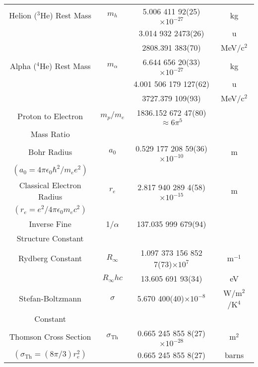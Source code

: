 \begin{table}[h]
\begin{tabular}{c c c c}
    Helion ($^3$He) Rest Mass  & $m_h$        & 5.006 411 92(25)$\times10^{-27}$   & kg \\
                               &              & 3.014 932 2473(26)                 & u \\
                               &              & 2808.391 383(70)                   & MeV/c$^2$ \\[6pt]
    
    Alpha ($^4$He) Rest Mass & $m_\alpha$    & 6.644 656 20(33)$\times10^{-27}$   & kg \\
                             &               & 4.001 506 179 127(62)              & u \\
                             &               & 3727.379 109(93)                   & MeV/c$^2$ \\[6pt]

    Proton to Electron & $m_{p}/m_{e}$ & 1836.152 672 47(80) $\approx 6 \pi^{5}$ &  \\
    Mass Ratio & & &\\[6pt]
    
    Bohr Radius                            & $a_0$   & 0.529 177 208 59(36)$\times10^{-10}$ & m \\
    $(a_0 = 4\pi\epsilon_0\hbar^2/m_ee^2)$ &         &                                      & \\[6pt]

    Classical Electron Radius           & $r_e$        & 2.817 940 289 4(58)$\times10^{-15}$ & m \\
    $(r_e = e^2/4\pi\epsilon_0m_ec^2)$  &              &                                     & \\[6pt]
    
    Inverse Fine & 1/$\alpha$ & 137.035 999 679(94)         & \\
    Structure Constant & & &\\[6pt]
    
    Rydberg Constant          & $R_\infty$     & 1.097 373 156 852 7(73)$\times10^7$ & m$^{-1}$ \\
                              & $R_\infty hc$  & 13.605 691 93(34)                       & eV \\[6pt]
    
    Stefan-Boltzmann & $\sigma$      & 5.670 400(40)$\times10^{-8}$     & W/m$^{2}$/K$^{4}$ \\
    Constant & & &\\[6pt]
    
    Thomson Cross Section  & $\sigma_\mathrm{Th}$ & 0.665 245 855 8(27)$\times10^{-28}$ & m$^2$ \\
    $(\sigma_\mathrm{Th} = \left( 8\pi / 3 \right)r_e^2)$ \B&          & 0.665 245 855 8(27)                   & barns \\[6pt] 
    \hline
  \end{tabular}
  \label{Table:atomNucConst}
\end{table}
\vfill

